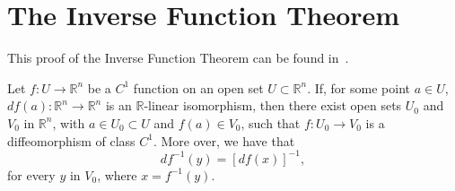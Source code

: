 \section{The Inverse Function Theorem}\label{sec:the_inverse_function_theorem}

This proof of the Inverse Function Theorem can be found in~\cite{lang2012real}.

\begin{theorem}\label{thm:the-inverse-function-theorem}
	Let \(f:U\to\mathbb{R}^{n}\) be a \(C^{1}\) function on an open set
	\({U}\subset{\mathbb{R}^{n}}\). If, for some point \({a}\in{U}\),
	\(df(a):\mathbb{R}^{n}\to\mathbb{R}^{n}\) is an \(\mathbb{R}\)-linear
	isomorphism, then there exist open sets \(U_{0}\) and \(V_{0}\) in
	\(\mathbb{R}^{n}\), with \({a}\in{U_{0}}\subset{U}\) and \({f(a)}\in{V_{0}}\),
	such that \(f:U_{0}\to{V_{0}}\) is a diffeomorphism of class \(C^{1}\). More
	over, we have that
	\[
		df^{-1}(y)=[df(x)]^{-1},
	\]
	for every \(y\) in \(V_{0}\), where \(x=f^{-1}(y)\).
\end{theorem}

